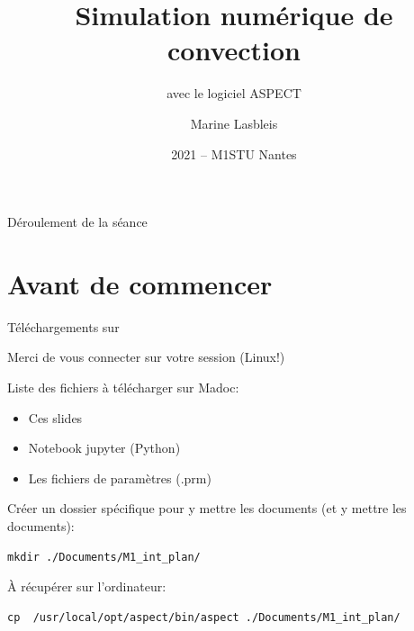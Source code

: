 \documentclass[9pt]{beamer}
\title{Simulation numérique de convection}
\subtitle{avec le logiciel ASPECT}
\date{2021 -- M1STU Nantes}
\author{Marine Lasbleis}
\begin{document}
\maketitle




\begin{frame}{Déroulement de la séance}
    \tableofcontents[hideallsubsections]
\end{frame}

\section{Avant de commencer}


\begin{frame}[fragile]{Téléchargements sur }

Merci de vous connecter sur votre session (Linux!)

\vspace{2em}

    Liste des fichiers à télécharger sur Madoc: 
    \begin{itemize}
        \item Ces slides
        \item Notebook jupyter (Python)
        \item Les fichiers de paramètres (.prm)
    \end{itemize}
    
    Créer un dossier spécifique pour y mettre les documents (et y mettre les documents): 

    \begin{verbatim}
mkdir ./Documents/M1_int_plan/
    \end{verbatim}
    
    À récupérer sur l'ordinateur: 
    \begin{verbatim}
cp  /usr/local/opt/aspect/bin/aspect ./Documents/M1_int_plan/
    \end{verbatim}


\end{frame}
\end{document}
